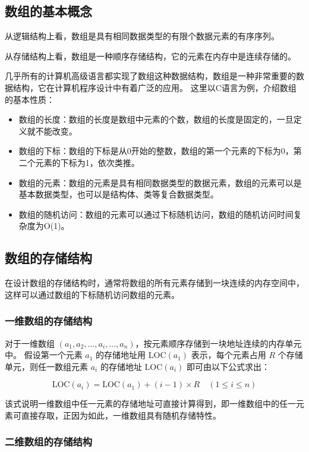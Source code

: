 \documentclass[lang=cn,newtx,10pt,scheme=chinese]{elegantbook}
\begin{document}
\subsection{数组的基本概念}

从逻辑结构上看，数组是具有相同数据类型的有限个数据元素的有序序列。

从存储结构上看，数组是一种顺序存储结构，它的元素在内存中是连续存储的。

几乎所有的计算机高级语言都实现了数组这种数据结构，数组是一种非常重要的数据结构，它在计算机程序设计中有着广泛的应用。
这里以C语言为例，介绍数组的基本性质：

\begin{itemize}
  \item 数组的长度：数组的长度是数组中元素的个数，数组的长度是固定的，一旦定义就不能改变。
  \item 数组的下标：数组的下标是从0开始的整数，数组的第一个元素的下标为0，第二个元素的下标为1，依次类推。
  \item 数组的元素：数组的元素是具有相同数据类型的数据元素，数组的元素可以是基本数据类型，也可以是结构体、类等复合数据类型。
  \item 数组的随机访问：数组的元素可以通过下标随机访问，数组的随机访问时间复杂度为O(1)。
\end{itemize}
\subsection{数组的存储结构}

在设计数组的存储结构时，通常将数组的所有元素存储到一块连续的内存空间中，这样可以通过数组的下标随机访问数组的元素。
\subsubsection{一维数组的存储结构}

对于一维数组 $(a_1, a_2, \dots, a_i, \dots, a_n)$，按元素顺序存储到一块地址连续的内存单元中。  
假设第一个元素 $a_1$ 的存储地址用 $\text{LOC}(a_1)$ 表示，每个元素占用 $R$ 个存储单元，则任一数组元素 $a_i$ 的存储地址 $\text{LOC}(a_i)$ 即可由以下公式求出：

\begin{equation}
    \text{LOC}(a_i) = \text{LOC}(a_1) + (i - 1) \times R \quad (1 \leq i \leq n)
\end{equation}

该式说明一维数组中任一元素的存储地址可直接计算得到，即一维数组中的任一元素可直接存取，正因为如此，一维数组具有随机存储特性。
\subsubsection{二维数组的存储结构}
\end{document}
